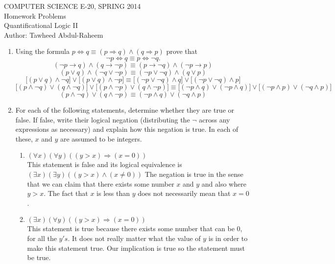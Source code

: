 \documentclass[12pt]{article}
\begin{document}
\begin{center}
COMPUTER SCIENCE E-20, SPRING 2014 \\
Homework Problems\\
Quantificational Logic II\\
Author: Tawheed Abdul-Raheem
\end{center}

\smallskip



\begin{enumerate}
\item Using the formula $p\Leftrightarrow q \equiv (p\Rightarrow q)\land (q\Rightarrow p)$ prove that $$\lnot p \Leftrightarrow q\equiv p\Leftrightarrow \lnot q.$$
        \[( \neg p \rightarrow q) \wedge (q \rightarrow \neg p) \equiv (p \rightarrow \neg q) \wedge (\neg p \rightarrow p) \]
        \[(p \vee q) \wedge (\neg q \vee \neg p) \equiv (\neg p \vee \neg q) \wedge (q \vee p) \]
        \[ \Big[ ( p \vee q) \wedge  \neg q \Big] \vee \Big[ (p \vee q) \wedge \neg p \Big] \equiv \Big[ (\neg p \vee \neg q) \wedge q \Big] \vee \Big[ (\neg p \vee \neg q) \wedge p \Big] \]
        \[ \Big[ ( p \wedge \neg q) \vee (q \wedge \neg q) \Big] \vee \Big[ (p \wedge \neg p) \vee (q \wedge \neg p) \Big] \equiv \Big[ (\neg p \wedge q) \vee (\neg p \wedge q) \Big] \vee \Big[ (\neg p \wedge p) \vee (\neg q \wedge p) \Big] \]
        \[(p \wedge \neg q) \vee (q \wedge \neg p) \equiv (\neg p \wedge q) \vee (\neg q \wedge p) \]
\item For each of the following statements, determine whether they are true or false. If false, write their logical negation (distributing the $\lnot$ across any expressions as necessary) and explain how this negation is true. In each of these, $x$ and $y$ are assumed to be integers.
\begin{enumerate}
\item $(\forall x)(\forall y) ((y>x) \Rightarrow (x=0))$ \\
This statement is false and its logical equivalence is $(\exists x )(\exists y)((y > x) \wedge (x \neq 0))$ The negation is true in the sense that we can claim that there exists some number $x$ and $y$ and also where $y> x$. The fact that $x$ is less than $y$ does not necessarily mean that $x = 0$.
\item $(\exists x) (\forall y) ((y>x) \Rightarrow (x=0))$ \\
This statement is true because there exists some number that can be $0$, for all the $y's$. It does not really matter what the value of $y$ is in order to make this statement true. Our implication is true so the statement must be true.

\end{enumerate}
\end{enumerate}
\end{document}
